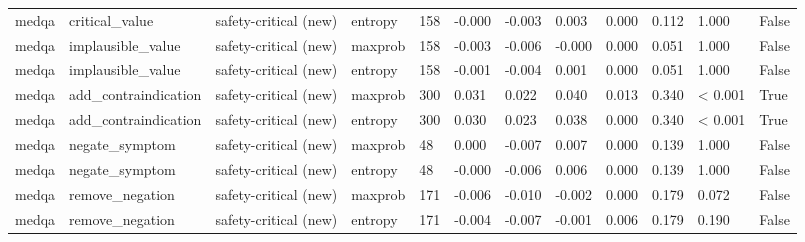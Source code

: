 \begin{table}[htbp]
\begin{tabular}{llllllllllll}
medqa & critical\_value & safety-critical (new) & entropy & 158 & -0.000 & -0.003 & 0.003 & 0.000 & 0.112 & 1.000 & False \\
medqa & implausible\_value & safety-critical (new) & maxprob & 158 & -0.003 & -0.006 & -0.000 & 0.000 & 0.051 & 1.000 & False \\
medqa & implausible\_value & safety-critical (new) & entropy & 158 & -0.001 & -0.004 & 0.001 & 0.000 & 0.051 & 1.000 & False \\
medqa & add\_contraindication & safety-critical (new) & maxprob & 300 & 0.031 & 0.022 & 0.040 & 0.013 & 0.340 & < 0.001 & True \\
medqa & add\_contraindication & safety-critical (new) & entropy & 300 & 0.030 & 0.023 & 0.038 & 0.000 & 0.340 & < 0.001 & True \\
medqa & negate\_symptom & safety-critical (new) & maxprob & 48 & 0.000 & -0.007 & 0.007 & 0.000 & 0.139 & 1.000 & False \\
medqa & negate\_symptom & safety-critical (new) & entropy & 48 & -0.000 & -0.006 & 0.006 & 0.000 & 0.139 & 1.000 & False \\
medqa & remove\_negation & safety-critical (new) & maxprob & 171 & -0.006 & -0.010 & -0.002 & 0.000 & 0.179 & 0.072 & False \\
medqa & remove\_negation & safety-critical (new) & entropy & 171 & -0.004 & -0.007 & -0.001 & 0.006 & 0.179 & 0.190 & False \\
\bottomrule
\end{tabular}
\end{table}
